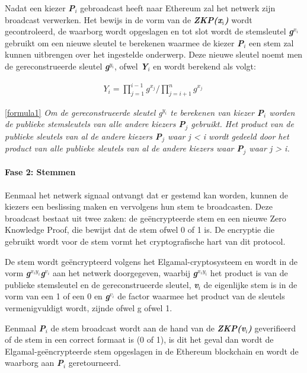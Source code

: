 			Nadat een kiezer \textbf{\textit{P$_{i}$}}  gebroadcast heeft naar Ethereum zal het netwerk zijn broadcast verwerken. Het bewijs in de vorm van de \textbf{\textit{ZKP(x$_{i}$)}} wordt gecontroleerd, de waarborg wordt opgeslagen en tot slot wordt de  stemsleutel \textbf{\textit{g$^{x_{i}}$}} gebruikt om een nieuwe sleutel te berekenen waarmee de kiezer \textbf{\textit{P$_{i}$}} een stem zal kunnen uitbrengen over het ingestelde onderwerp. Deze nieuwe sleutel noemt men de gereconstrueerde sleutel \textbf{\textit{g$^{y_{i}}$}}, ofwel \textbf{\textit{Y$_{i}$}} en wordt berekend als volgt: 
			\begin{ceqn}
				\begin{align}
					Y_{i} = \prod_{j=1}^{i-1}g^{x_{j}}  / \prod_{j=i+1}^{n}g^{x_{j}} \label{formula1}\
				\end{align}
			\end{ceqn}
			
			\eqref{formula1} \textit{Om de gereconstrueerde sleutel g$^{y_{i}}$ te berekenen van kiezer \textbf{P$_{i}$} worden de publieke stemsleutels van alle andere kiezers \textbf{P$_{j}$} gebruikt. Het product van de publieke sleutels van al de andere kiezers \textbf{P$_{j}$} waar j < i wordt gedeeld door het product van alle publieke sleutels van al de andere kiezers waar \textbf{P$_{j}$} waar  j > i.}
			
			\paragraph*{Fase 2: Stemmen}
			Eenmaal het netwerk signaal ontvangt dat er gestemd kan worden, kunnen de kiezers een beslissing maken en vervolgens hun stem te broadcasten. Deze broadcast bestaat uit twee zaken: de geëncrypteerde stem en een nieuwe Zero Knowledge Proof, die bewijst dat de stem ofwel 0 of 1 is. De encryptie die gebruikt wordt voor de stem vormt het cryptografische hart van dit protocol. 
			
			De stem wordt geëncrypteerd volgens het Elgamal-cryptosysteem en wordt in de vorm  \textbf{\textit{g$^{x_{i}y_{i}}$g$^{v_{i}}$}} aan het netwerk doorgegeven,  waarbij  \textbf{\textit{g$^{x_{i}y_{i}}$}} het product is van de publieke stemsleutel en de gereconstrueerde sleutel, \textbf{\textit{v$_{i}$}} de eigenlijke stem is in de vorm van een 1 of een 0 en \textbf{\textit{g$^{v_{i}}$}} de factor waarmee het product van de sleutels vermenigvuldigt wordt, zijnde ofwel g ofwel 1. 
			
			Eenmaal \textbf{\textit{P$_{i}$}} de stem broadcast wordt aan de hand van de \textbf{\textit{ZKP(v$_{i}$)}} geverifieerd of de stem in een correct formaat is (0 of 1), is dit het geval dan wordt de Elgamal-geëncrypteerde stem opgeslagen in de Ethereum blockchain en wordt de waarborg aan \textbf{\textit{P$_{i}$}} geretourneerd.
			
